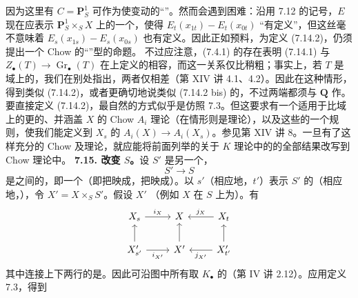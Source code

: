 因为这里有 $C=\mathbf P^1_S$ 可作为使变动的“”。然而会遇到困难：沿用 7.12 的记号，$E$ 现在应表示 $\mathbf P^1_S\times_S X$ 上的一个，使得 $E_t(x_{1t})-E_t(x_{0t})$ “有定义”，但这丝毫不意味着 $E_s(x_{1s})-E_s(x_{0s})$ 也有定义。因此正如预料，为定义 (7.14.2)，仍须提出一个 Chow 的“”型的命题。
不过应注意，(7.4.1) 的存在表明 (7.14.1) 与 $Z_\bullet(T)\to\operatorname{Gr}_\bullet(T)$ 在上定义的相容，而这一关系仅比稍粗；事实上，若 $T$ 是域上的，我们在别处指出，两者仅相差（第 XIV 讲 4.1、4.2）。因此在这种情形，得到类似 (7.14.2)，或者更确切地说类似 (7.14.2 bis) 的，不过两端都须与 $\mathbf Q$ 作。
要直接定义 (7.14.2)，最自然的方式似乎是仿照 7.3。但这要求有一个适用于比域上的更的、并涵盖 $X$ 的 Chow  $A_i$ 理论（在情形则是理论），以及这些的一个规则，使我们能定义到 $X_s$ 的 $A_i(X)\to A_i(X_s)$。参见第 XIV 讲 8。一旦有了这样充分的 Chow 及理论，就应能将前面列举的关于 $K$ 理论中的的全部结果改写到 Chow 理论中。
\textbf{7.15. 改变 $S$。}设 $S'$ 是另一个，
\[S'\longrightarrow S\]
是之间的，即一个（即把映成，把映成）。以 $s'$（相应地，$t'$）表示 $S'$ 的（相应地，），令 $X'=X\times_S S'$。假设 $X'$ （例如 $X$ 在 $S$ 上为）。有
\[\begin{tikzcd}X_s\arrow[r,"i_X"]&X&X_t\arrow[l,"j_X"']\\X'_{s'}\arrow[u]\arrow[r,"i_{X'}"']&X'\arrow[u]&X'_{t'}\arrow[u]\arrow[l,"j_{X'}"]\end{tikzcd}\]
其中连接上下两行的是。因此可沿图中所有取 $K_\bullet$ 的（第 IV 讲 2.12）。应用定义 7.3，得到
